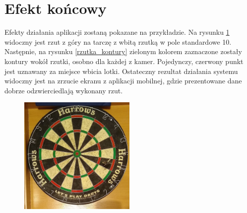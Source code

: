 \section{Efekt końcowy}
Efekty działania aplikacji zostaną pokazane na przykładzie. Na rysunku \ref{rzutka_gora} widoczny jest rzut z góry na tarczę z wbitą rzutką w pole standardowe 10. Następnie, na rysunku \ref{rzutka_kontury} zielonym kolorem zaznaczone zostały kontury wokół rzutki, osobno dla każdej z kamer. Pojedynczy, czerwony punkt jest uznawany za miejsce wbicia lotki. Ostateczny rezultat działania systemu widoczny jest na zrzucie ekranu z aplikacji mobilnej, gdzie prezentowane dane dobrze odzwierciedlają wykonany rzut.
\begin{figure}[h!]
\begin{center}
\includegraphics[width=0.5\textwidth]{obrazki/rzutka_gora.jpg}
\end{center}
\label{rzutka_gora}
\end{figure} 

